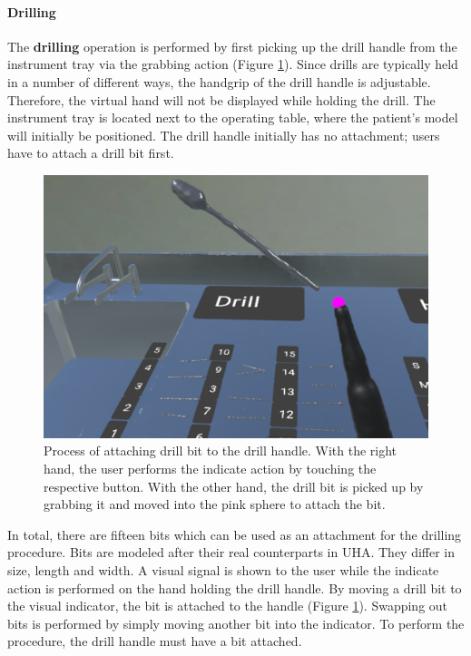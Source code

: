 \paragraph{Drilling}

The \textbf{drilling} operation is performed by first picking up the drill handle from the instrument tray via the grabbing action (Figure \ref{fig::FeatureDrillingAttachments}).
Since drills are typically held in a number of different ways, the handgrip of the drill handle is adjustable.
Therefore, the virtual hand will not be displayed while holding the drill.
The instrument tray is located next to the operating table, where the patient's model will initially be positioned.
The drill handle initially has no attachment; users have to attach a drill bit first.

\begin{figure}[ht]
    \centering
    \includegraphics[width=\linewidth]{images/implementation/features/procedures/drilling_attachment.png}
    \caption{\label{fig::FeatureDrillingAttachments}Process of attaching drill bit to the drill handle. With the right hand, the user performs the indicate action by touching 
    the respective button. With the other hand, the drill bit is picked up by grabbing it and moved into the pink sphere to attach the bit.}
\end{figure}

In total, there are fifteen bits which can be used as an attachment for the drilling procedure.
Bits are modeled after their real counterparts in UHA.
They differ in size, length and width.
A visual signal is shown to the user while the indicate action is performed on the hand holding the drill handle.
By moving a drill bit to the visual indicator, the bit is attached to the handle (Figure \ref{fig::FeatureDrillingAttachments}).
Swapping out bits is performed by simply moving another bit into the indicator.
To perform the procedure, the drill handle must have a bit attached. 

